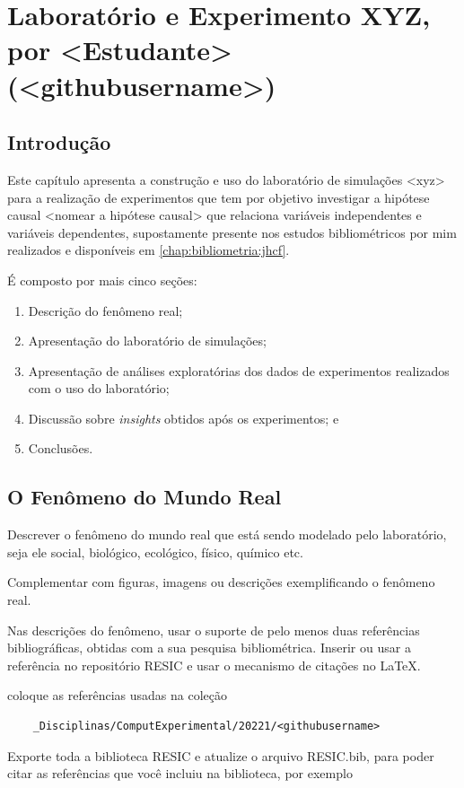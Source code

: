 \chapter{Laboratório e Experimento XYZ, por <Estudante> (<githubusername>)\label{desenho:experimento:jhcf}}

\section{Introdução}

Este capítulo apresenta a construção e uso do laboratório de simulações <xyz> para a realização de experimentos que tem por objetivo investigar a hipótese causal <nomear a hipótese causal> que relaciona variáveis independentes e variáveis dependentes, supostamente presente nos estudos bibliométricos por mim realizados e disponíveis em \ref{chap:bibliometria:jhcf}.

É composto por mais cinco seções: 
\begin{enumerate}
    \item Descrição do fenômeno real;
    \item Apresentação do laboratório de simulações;
    \item Apresentação de análises exploratórias dos dados de experimentos realizados com o uso do laboratório;
    \item Discussão sobre \textit{insights} obtidos após os experimentos; e
    \item Conclusões.
\end{enumerate}

\section{O Fenômeno do Mundo Real}

Descrever o fenômeno do mundo real que está sendo modelado pelo laboratório, seja ele social, biológico, ecológico, físico, químico etc.

Complementar com figuras, imagens ou descrições exemplificando o fenômeno real.

Nas descrições do fenômeno, usar o suporte de pelo menos duas referências bibliográficas, obtidas com a sua pesquisa bibliométrica.
Inserir ou usar a referência no repositório RESIC e usar o mecanismo de citações no \LaTeX.

coloque as referências usadas na coleção 
\begin{verbatim}
    _Disciplinas/ComputExperimental/20221/<githubusername>
\end{verbatim}
Exporte toda a biblioteca RESIC e atualize o arquivo RESIC.bib, para poder citar as referências que você incluiu na biblioteca, por exemplo \cite{gregoire_professional_2021}

